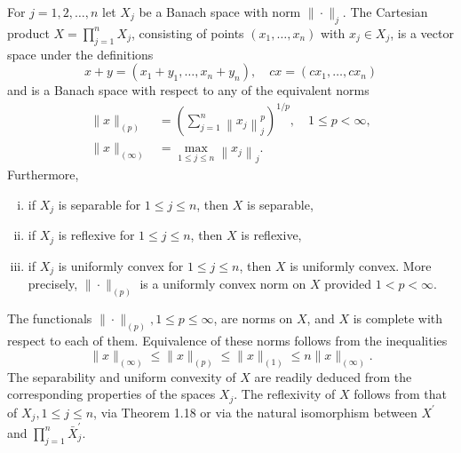 \begin{theorem}
  For $j=1,2, \ldots, n$ let $X_j$ be a Banach space with norm $\|\cdot\|_j$. The Cartesian product $X=\prod_{j=1}^n X_j$, consisting of points $\left(x_1, \ldots, x_n\right)$ with $x_j \in X_j$, is a vector space under the definitions
  \[
  x+y=\left(x_1+y_1, \ldots, x_n+y_n\right), \quad c x=\left(c x_1, \ldots, c x_n\right)
  \]
  and is a Banach space with respect to any of the equivalent norms
  \[
  \begin{aligned}
  \|x\|_{(p)} & =\left(\sum_{j=1}^n\left\|x_j\right\|_j^p\right)^{1 / p}, \quad 1 \leq p<\infty, \\
  \|x\|_{(\infty)} & =\max _{1 \leq j \leq n}\left\|x_j\right\|_j .
  \end{aligned}
  \]
  Furthermore,
  \begin{enumerate}[(i)]
    \item if $X_j$ is separable for $1 \leq j \leq n$, then $X$ is separable,
    \item if $X_j$ is reflexive for $1 \leq j \leq n$, then $X$ is reflexive,
    \item if $X_j$ is uniformly convex for $1 \leq j \leq n$, then $X$ is uniformly convex. More precisely, $\|\cdot\|_{(p)}$ is a uniformly convex norm on $X$ provided $1<p<\infty$.
  \end{enumerate}
\end{theorem}

The functionals $\|\cdot\|_{(p)}, 1 \leq p \leq \infty$, are norms on $X$, and $X$ is complete with respect to each of them. Equivalence of these norms follows from the inequalities
\[
\|x\|_{(\infty)} \leq\|x\|_{(p)} \leq\|x\|_{(1)} \leq n\|x\|_{(\infty)} .
\]
The separability and uniform convexity of $X$ are readily deduced from the corresponding properties of the spaces $X_j$. The reflexivity of $X$ follows from that of $X_j, 1 \leq j \leq n$, via Theorem 1.18 or via the natural isomorphism between $X^{\prime}$ and $\prod_{j=1}^n \bar{X}_j^{\prime}$.


